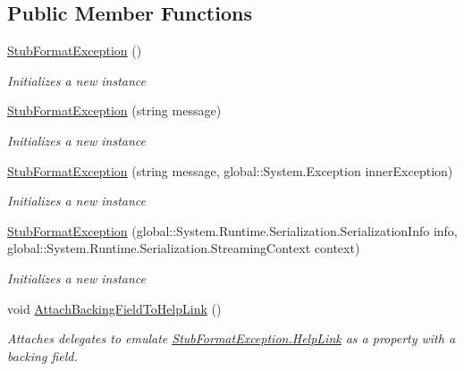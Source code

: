 \subsection*{Public Member Functions}
\begin{DoxyCompactItemize}
\item 
\hyperlink{class_system_1_1_fakes_1_1_stub_format_exception_a16d43fcbf25835e7e84b952f2789207a}{Stub\-Format\-Exception} ()
\begin{DoxyCompactList}\small\item\em Initializes a new instance\end{DoxyCompactList}\item 
\hyperlink{class_system_1_1_fakes_1_1_stub_format_exception_a82b9a783d5ea5e781af8da44977bf2ab}{Stub\-Format\-Exception} (string message)
\begin{DoxyCompactList}\small\item\em Initializes a new instance\end{DoxyCompactList}\item 
\hyperlink{class_system_1_1_fakes_1_1_stub_format_exception_ab176b4e21f8f7a07d59ddc05d5bddc8f}{Stub\-Format\-Exception} (string message, global\-::\-System.\-Exception inner\-Exception)
\begin{DoxyCompactList}\small\item\em Initializes a new instance\end{DoxyCompactList}\item 
\hyperlink{class_system_1_1_fakes_1_1_stub_format_exception_adb8c284cad74d7f767dda3cbfbe6545c}{Stub\-Format\-Exception} (global\-::\-System.\-Runtime.\-Serialization.\-Serialization\-Info info, global\-::\-System.\-Runtime.\-Serialization.\-Streaming\-Context context)
\begin{DoxyCompactList}\small\item\em Initializes a new instance\end{DoxyCompactList}\item 
void \hyperlink{class_system_1_1_fakes_1_1_stub_format_exception_a0fee2f01e80a7701e6e04ed9ad0825a1}{Attach\-Backing\-Field\-To\-Help\-Link} ()
\begin{DoxyCompactList}\small\item\em Attaches delegates to emulate \hyperlink{class_system_1_1_fakes_1_1_stub_format_exception_aa2a4b07c3883c7dd183ae43bfd551d2e}{Stub\-Format\-Exception.\-Help\-Link} as a property with a backing field.\end{DoxyCompactList}\item 

\end{DoxyCompactItemize}
